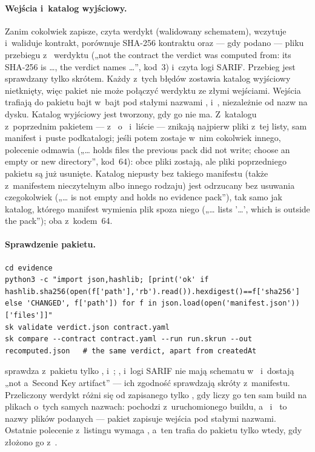 \paragraph{Wejścia i~katalog wyjściowy.} Zanim cokolwiek zapisze,  czyta
werdykt (walidowany schematem), wczytuje i~waliduje kontrakt, porównuje SHA-256 kontraktu oraz
--- gdy podano  --- pliku przebiegu z~ werdyktu („not the
contract the verdict was computed from: its SHA-256 is …, the verdict names …”, kod~3) i~czyta
logi SARIF. Przebieg jest sprawdzany tylko skrótem. Każdy z~tych błędów zostawia katalog
wyjściowy nietknięty, więc pakiet nie może połączyć werdyktu ze złymi wejściami. Wejścia
trafiają do pakietu bajt w~bajt pod stałymi nazwami ,
 i~, niezależnie od nazw na dysku. Katalog wyjściowy
jest tworzony, gdy go nie ma. Z~katalogu z~poprzednim pakietem --- z~
o~  i~liście  --- znikają
najpierw pliki z~tej listy, sam manifest i~puste podkatalogi; jeśli potem zostaje w~nim
cokolwiek innego, polecenie odmawia („… holds files the previous pack did not write; choose an
empty or new directory”, kod~64): obce pliki zostają, ale pliki poprzedniego pakietu są już
usunięte. Katalog niepusty bez takiego manifestu (także z~manifestem nieczytelnym albo innego
rodzaju) jest odrzucany bez usuwania czegokolwiek („… is not empty and holds no evidence pack”),
tak samo jak katalog, którego manifest wymienia plik spoza niego („… lists '…', which is outside
the pack”); oba z~kodem~64.

\paragraph{Sprawdzenie pakietu.}

\begin{lstlisting}
cd evidence
python3 -c "import json,hashlib; [print('ok' if hashlib.sha256(open(f['path'],'rb').read()).hexdigest()==f['sha256'] else 'CHANGED', f['path']) for f in json.load(open('manifest.json'))['files']]"
sk validate verdict.json contract.yaml
sk compare --contract contract.yaml --run run.skrun --out recomputed.json   # the same verdict, apart from createdAt
\end{lstlisting}

 sprawdza z~pakietu tylko , 
i~; ,  i~logi SARIF nie
mają schematu w~ i~dostają „not a~Second Key artifact” --- ich zgodność sprawdzają
skróty z~manifestu. Przeliczony werdykt różni się od zapisanego tylko , gdy
liczy go ten sam build  na plikach o~tych samych nazwach:  pochodzi
z~uruchomionego buildu, a~ i~ to nazwy
plików podanych  --- pakiet zapisuje wejścia pod stałymi nazwami. Ostatnie
polecenie z~listingu wymaga , a~ten trafia do pakietu tylko wtedy, gdy złożono go
z~.

